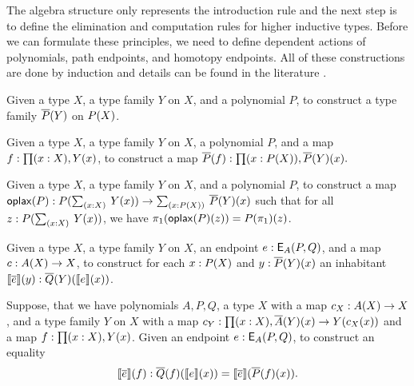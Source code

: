 The algebra structure only represents the introduction rule
and the next step is to define the elimination and computation rules for higher inductive types.
Before we can formulate these principles, we need to define dependent actions of polynomials, path endpoints, and homotopy endpoints.
All of these constructions are done by induction and details can be found in the literature \cite{DBLP:journals/entcs/DybjerM18,hermida1998structural,van2019construction}.

\begin{problem}
\label{prob:poly_dact}
Given a type $X$, a type family $Y$ on $X$, and a polynomial $P$,
to construct a type family $\overline{P}(Y)$ on $P(X)$.
\end{problem}

\begin{problem}
\label{prob:poly_dmap}
Given a type $X$, a type family $Y$ on $X$, a polynomial $P$, and a map $f : \prod (x : X) , Y(x)$,
to construct a map
$
\overline{P}(f) : \prod (x : P(X)) , \overline{P}(Y)(x).
$
\end{problem}

\begin{problem}
\label{prob:poly_pr}
Given a type $X$, a type family $Y$ on $X$, and a polynomial $P$, to construct a map
$
\polyoplax P : \polyAct{P}{\Sum (x : X). Y(x)} \rightarrow \Sum (x : \polyAct{P}{X}). \polyDact{P}{Y}(x)
$
such that for all $z :  \polyAct{P}{\Sum (x : X). Y(x)}$, we have $\pi_1(\mathsf{oplax}(P)(z)) = P(\pi_1)(z)$.
\end{problem}

\begin{problem}
\label{prob:endpoint_dact}
Given a type $X$, a type family $Y$ on $X$, an endpoint $e : \mathsf{E}_{A}(P,Q)$, and a map $c : A(X) \rightarrow X$,
to construct for each $x : P(X)$ and $y : \overline{P}(Y)(x)$ an inhabitant $\llbracket \overline{e} \rrbracket(y) : \overline{Q}(Y)(\llbracket e \rrbracket(x))$.
\end{problem}

\begin{problem}
\label{prob:endpoint_dact_natural}
Suppose, that we have polynomials $A, P, Q$, a type $X$ with a map $c_X : A(X) \rightarrow X$,
and a type family $Y$ on $X$ with a map $c_Y : \prod (x : X) , \overline{A}(Y)(x) \rightarrow Y(c_X(x))$
and a map $f : \prod (x : X) , Y(x)$.
Given an endpoint $e : \mathsf{E}_{A}(P,Q)$,
to construct an equality
\[
\llbracket \overline{e} \rrbracket(f) : \overline{Q}(f)(\llbracket e \rrbracket(x)) = \llbracket \overline{e} \rrbracket(\overline{P}(f)(x)).
\]
\end{problem}

